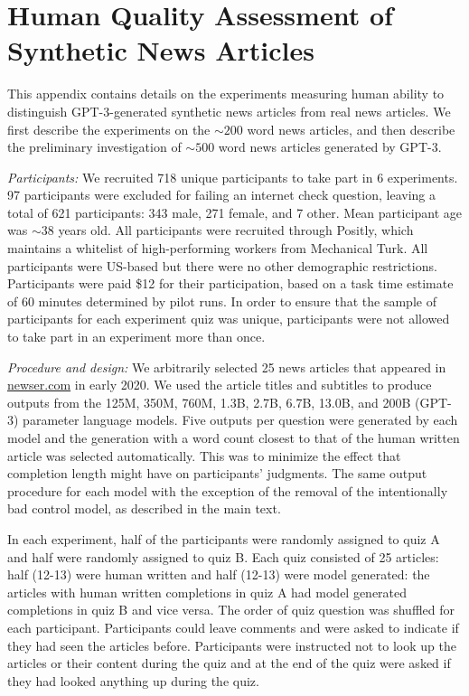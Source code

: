 \documentclass{article}
\begin{document}
\section{Human Quality Assessment of Synthetic News Articles}
\label{appendix:human_assessment}
This appendix contains details on the experiments measuring human ability to distinguish GPT-3-generated synthetic news articles from real news articles. We first describe the experiments on the $\sim200$ word news articles, and then describe the preliminary investigation of $\sim500$ word news articles generated by GPT-3.

\textit{Participants:} We recruited 718 unique participants to take part in 6 experiments. 97 participants were excluded  for failing an internet check question, leaving a total of 621 participants: 343 male, 271 female, and 7 other. Mean participant age was $\sim38$ years old. All participants were recruited through Positly, which maintains a whitelist of high-performing workers from Mechanical Turk. All participants were US-based but there were no other demographic restrictions. Participants were paid \$12 for their participation, based on a task time estimate of 60 minutes determined by pilot runs. In order to ensure that the sample of participants for each experiment quiz was unique, participants were not allowed to take part in an experiment more than once.

\textit{Procedure and design:} We arbitrarily selected 25 news articles that appeared in \href{newser.com}{newser.com} in early 2020. We used the article titles and subtitles to produce outputs from the 125M, 350M, 760M, 1.3B, 2.7B, 6.7B, 13.0B, and 200B (GPT-3) parameter language models. Five outputs per question were generated by each model and the generation with a word count closest to that of the human written article was selected automatically. This was to minimize the effect that completion length might have on participants’ judgments.  The same output procedure for each model with the exception of the removal of the intentionally bad control model, as described in the main text. 

In each experiment, half of the participants were randomly assigned to quiz A and half were randomly assigned to quiz B. Each quiz consisted of 25 articles: half (12-13) were human written and half (12-13) were model generated: the articles with human written completions in quiz A had model generated completions in quiz B and vice versa. The order of quiz question was shuffled for each participant. Participants could leave comments and were asked to indicate if they had seen the articles before. Participants were instructed not to look up the articles or their content during the quiz and at the end of the quiz were asked if they had looked anything up during the quiz.
\end{document}
